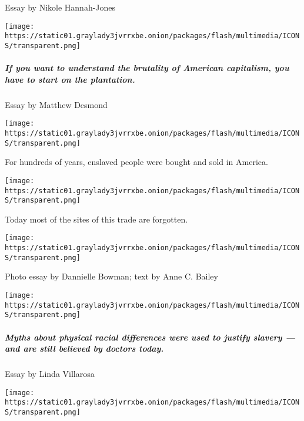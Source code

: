 Essay by Nikole Hannah-Jones

\texttt{[image: https://static01.graylady3jvrrxbe.onion/packages/flash/multimedia/ICONS/transparent.png]}

\href{/interactive/2019/08/14/magazine/slavery-capitalism.html}{}

\hypertarget{if-you-want-to-understand-the-brutality-of-american-capitalism-you-have-to-start-on-the-plantation}{%
\subparagraph{If you want to understand the brutality of American
capitalism, you have to start on the
plantation.}\label{if-you-want-to-understand-the-brutality-of-american-capitalism-you-have-to-start-on-the-plantation}}

Essay by Matthew Desmond

\href{https://www.nytimes3xbfgragh.onion/interactive/2020/02/12/magazine/1619-project-slave-auction-sites.html}{}

\texttt{[image: https://static01.graylady3jvrrxbe.onion/packages/flash/multimedia/ICONS/transparent.png]}

For hundreds of years, enslaved people were bought and sold in America.

\texttt{[image: https://static01.graylady3jvrrxbe.onion/packages/flash/multimedia/ICONS/transparent.png]}

Today most of the sites of this trade are forgotten.

\texttt{[image: https://static01.graylady3jvrrxbe.onion/packages/flash/multimedia/ICONS/transparent.png]}

Photo essay by Dannielle Bowman; text by Anne C. Bailey

\texttt{[image: https://static01.graylady3jvrrxbe.onion/packages/flash/multimedia/ICONS/transparent.png]}

\href{/interactive/2019/08/14/magazine/racial-differences-doctors.html}{}

\hypertarget{myths-about-physical-racial-differences-were-used-to-justify-slavery--and-are-still-believed-by-doctors-today}{%
\subparagraph{Myths about physical racial differences were used to
justify slavery --- and are still believed by doctors
today.}\label{myths-about-physical-racial-differences-were-used-to-justify-slavery--and-are-still-believed-by-doctors-today}}

Essay by Linda Villarosa

\texttt{[image: https://static01.graylady3jvrrxbe.onion/packages/flash/multimedia/ICONS/transparent.png]}

\href{/interactive/2019/08/14/magazine/republicans-racism-african-americans.html}{}

